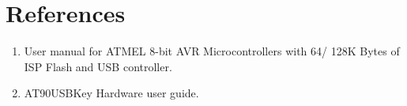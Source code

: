 \section{References}\label{sec:references}

\begin{enumerate}
	\item User manual for ATMEL 8-bit AVR Microcontrollers with 64/ 128K Bytes of ISP Flash and USB controller.
	\item AT90USBKey Hardware user guide.
\end{enumerate}